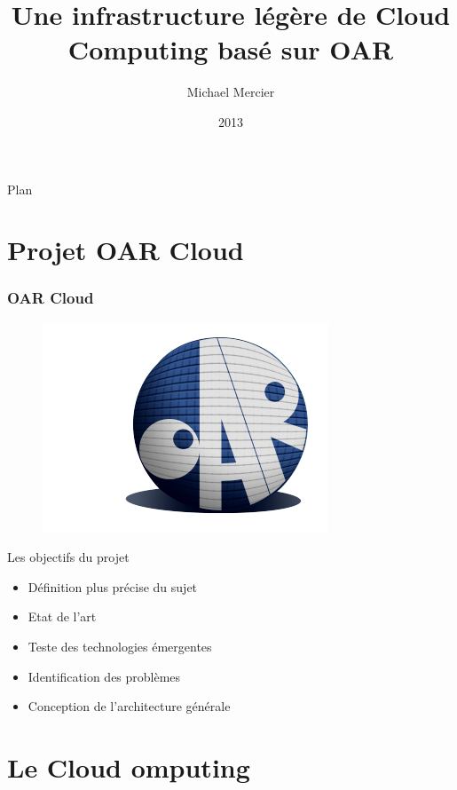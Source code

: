 \documentclass{beamer}
\title[OAR Cloud]{Une infrastructure légère de Cloud Computing basé sur OAR}
\institute{Polytech Grenoble, INRIA\\\scalebox{2}{\insertlogo}}
\author{Michael Mercier}
\date{2013}
\begin{document}
	\begin{frame}
		\titlepage
	\end{frame}
	
	
	\begin{frame} 
		\begin{center}{\Large Plan }\end{center}
		\tableofcontents[hidesubsections]
	\end{frame}
	
	
  \section{Projet OAR Cloud}
		\begin{frame}
			\frametitle{OAR Cloud}
			\begin{figure}
			  \includegraphics[scale=0.3]{img/logo_oar.png}
 			\end{figure}
			Les objectifs du projet
			\begin{itemize}
			  \item Définition plus précise du sujet
			  \item Etat de l'art
			  \item Teste des technologies émergentes
			  \item Identification des problèmes
			  \item Conception de l'architecture générale
			\end{itemize}			
		\end{frame}
			
			
			
	\section{Le Cloud omputing}
	
\end{document}

